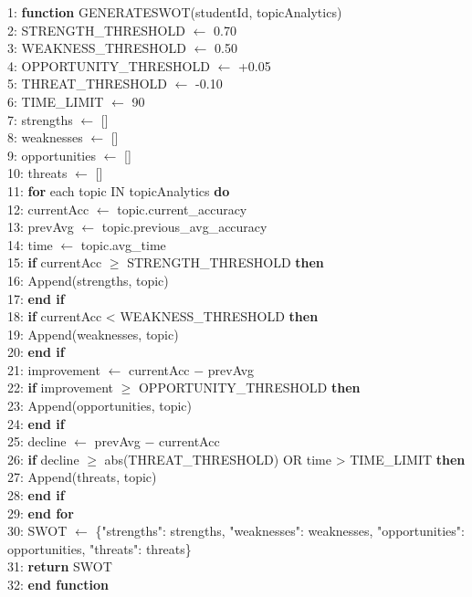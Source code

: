 \begin{sloppypar}
1: \textbf{function} GENERATESWOT(studentId, topicAnalytics)\\
2: \quad STRENGTH\_THRESHOLD $\leftarrow$ 0.70\\
3: \quad WEAKNESS\_THRESHOLD $\leftarrow$ 0.50\\
4: \quad OPPORTUNITY\_THRESHOLD $\leftarrow$ +0.05\\
5: \quad THREAT\_THRESHOLD $\leftarrow$ -0.10\\
6: \quad TIME\_LIMIT $\leftarrow$ 90\\
7: \quad strengths $\leftarrow$ []\\
8: \quad weaknesses $\leftarrow$ []\\
9: \quad opportunities $\leftarrow$ []\\
10: \quad threats $\leftarrow$ []\\
11: \quad \textbf{for} each topic IN topicAnalytics \textbf{do}\\
12: \qquad currentAcc $\leftarrow$ topic.current\_accuracy\\
13: \qquad prevAvg $\leftarrow$ topic.previous\_avg\_accuracy\\
14: \qquad time $\leftarrow$ topic.avg\_time\\
15: \qquad \textbf{if} currentAcc $\geq$ STRENGTH\_THRESHOLD \textbf{then}\\
16: \qquad\quad Append(strengths, topic)\\
17: \qquad \textbf{end if}\\
18: \qquad \textbf{if} currentAcc < WEAKNESS\_THRESHOLD \textbf{then}\\
19: \qquad\quad Append(weaknesses, topic)\\
20: \qquad \textbf{end if}\\
21: \qquad improvement $\leftarrow$ currentAcc $-$ prevAvg\\
22: \qquad \textbf{if} improvement $\geq$ OPPORTUNITY\_THRESHOLD \textbf{then}\\
23: \qquad\quad Append(opportunities, topic)\\
24: \qquad \textbf{end if}\\
25: \qquad decline $\leftarrow$ prevAvg $-$ currentAcc\\
26: \qquad \textbf{if} decline $\geq$ abs(THREAT\_THRESHOLD) OR time > TIME\_LIMIT \textbf{then}\\
27: \qquad\quad Append(threats, topic)\\
28: \qquad \textbf{end if}\\
29: \quad \textbf{\textbf{end for}}\\
30: \quad SWOT $\leftarrow$ \{"strengths": strengths, "weaknesses": weaknesses, "opportunities": opportunities, "threats": threats\}\\
31: \quad \textbf{return} SWOT\\
32: \textbf{end function}
\algofooter


\end{sloppypar}
